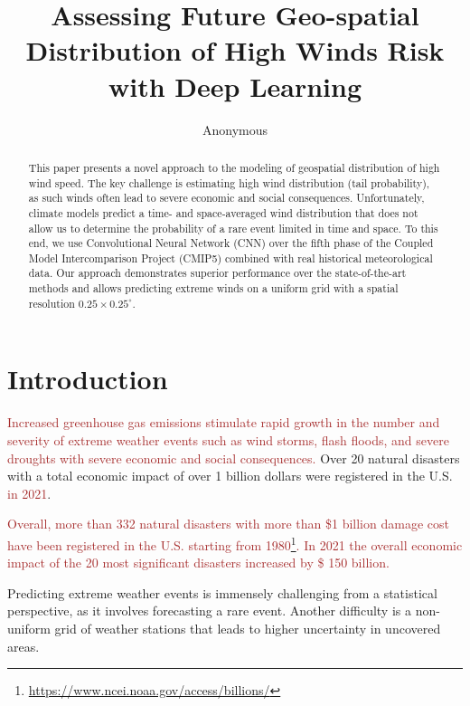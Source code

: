 \documentclass{article}
\title{Assessing Future Geo-spatial Distribution of High Winds Risk with Deep Learning}
\author{
    Anonymous
}
\begin{document}
\maketitle

\begin{abstract}
This paper presents a novel approach to the modeling of geospatial distribution of high wind speed. The key challenge is estimating high wind distribution (tail probability), as such winds often lead to severe economic and social consequences. Unfortunately, climate models predict a time- and space-averaged wind distribution that does not allow us to determine the probability of a rare event limited in time and space. To this end, we use Convolutional Neural Network (CNN) over the fifth phase of the Coupled Model Intercomparison Project (CMIP5) combined with real historical meteorological data. Our approach demonstrates superior performance over the state-of-the-art methods and allows predicting extreme winds on a uniform grid with a spatial resolution $0.25 \times 0.25^\circ$.
\end{abstract}

\section{Introduction}
\label{sec:intro}

%
\textcolor{brown}{Increased greenhouse gas emissions stimulate rapid growth in the number and severity of extreme weather events such as wind storms, flash floods, and severe droughts with severe economic and social consequences.} Over 20 natural disasters with a total economic impact of over 1 billion dollars were registered in the U.S. \textcolor{brown}{in 2021}. 

\textcolor{brown}{Overall, more than 332 natural disasters with more than \$1 billion damage cost have been registered in the U.S. starting from 1980\footnote{\url{https://www.ncei.noaa.gov/access/billions/}}. In 2021 the overall economic impact of the 20 most significant disasters increased by \$ 150 billion. }

Predicting extreme weather events is immensely challenging from a statistical perspective, as it involves forecasting a rare event. Another difficulty is a non-uniform grid of weather stations that leads to higher uncertainty in uncovered areas. 
\end{document}
